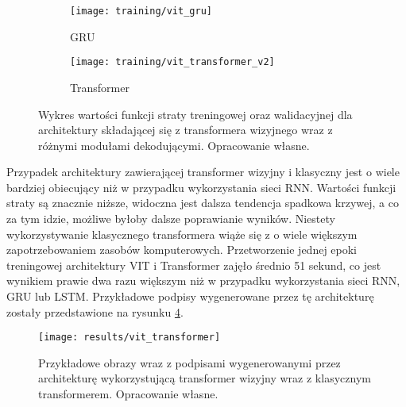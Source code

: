 \begin{figure}[H]
    \centering
    \begin{subfigure}{.5\textwidth}
        \centering
        \texttt{[image: training/vit\_gru]}
        \caption{GRU}
        \label{fig:training-vit-gru}
    \end{subfigure}%
    \centering
    \begin{subfigure}{.5\textwidth}
        \centering
        \texttt{[image: training/vit\_transformer\_v2]}
        \caption{Transformer}
        \label{fig:training-vit-transformer}
    \end{subfigure}%
    \caption{Wykres wartości funkcji straty treningowej oraz walidacyjnej dla architektury składającej się z transformera wizyjnego wraz z różnymi modułami dekodującymi. Opracowanie własne.}
    \label{fig:training-vit-gru-transformer}
\end{figure}
\noindent Przypadek architektury zawierającej transformer wizyjny i klasyczny jest o wiele bardziej obiecujący niż w przypadku wykorzystania sieci RNN. Wartości funkcji straty są znacznie niższe, widoczna jest dalsza tendencja spadkowa krzywej, a co za tym idzie, możliwe byłoby dalsze poprawianie wyników. Niestety wykorzystywanie klasycznego transformera wiąże się z o wiele większym zapotrzebowaniem zasobów komputerowych. Przetworzenie jednej epoki treningowej architektury VIT i Transformer zajęło średnio 51 sekund, co jest wynikiem prawie dwa razu większym niż w przypadku wykorzystania sieci RNN, GRU lub LSTM. Przykładowe podpisy wygenerowane przez tę architekturę zostały przedstawione na rysunku \ref{fig:results-vit-transformer}.
\begin{figure}[H]
    \centering
    \texttt{[image: results/vit\_transformer]}
    \caption{Przykładowe obrazy wraz z podpisami wygenerowanymi przez architekturę wykorzystującą transformer wizyjny wraz z klasycznym transformerem. Opracowanie własne.}
    \label{fig:results-vit-transformer}
\end{figure}

